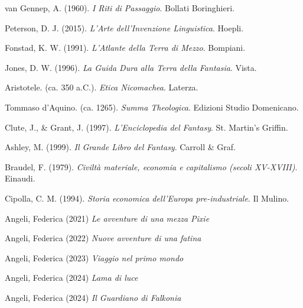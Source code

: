 van Gennep, A. (1960).
\textit{I Riti di Passaggio}.
Bollati Boringhieri.

Peterson, D. J. (2015).
\textit{L'Arte dell'Invenzione Linguistica}.
Hoepli.

Fonstad, K. W. (1991).
\textit{L'Atlante della Terra di Mezzo}.
Bompiani.

Jones, D. W. (1996).
\textit{La Guida Dura alla Terra della Fantasia}.
Vista.

Aristotele. (ca. 350 a.C.).
\textit{Etica Nicomachea}.
Laterza.

Tommaso d'Aquino. (ca. 1265).
\textit{Summa Theologica}.
Edizioni Studio Domenicano.

Clute, J., \& Grant, J. (1997).
\textit{L'Enciclopedia del Fantasy}.
St. Martin's Griffin.

Ashley, M. (1999).
\textit{Il Grande Libro del Fantasy}.
Carroll \& Graf.

Braudel, F. (1979).
\textit{Civiltà materiale, economia e capitalismo (secoli XV-XVIII)}.
Einaudi.

Cipolla, C. M. (1994).
\textit{Storia economica dell'Europa pre-industriale}.
Il Mulino.

Angeli, Federica (2021)
\textit{Le avventure di una mezza Pixie}

Angeli, Federica (2022)
\textit{Nuove avventure di una fatina}

Angeli, Federica (2023)
\textit{Viaggio nel primo mondo}

Angeli, Federica (2024)
\textit{Lama di luce}

Angeli, Federica (2024)
\textit{Il Guardiano di Falkonia}

